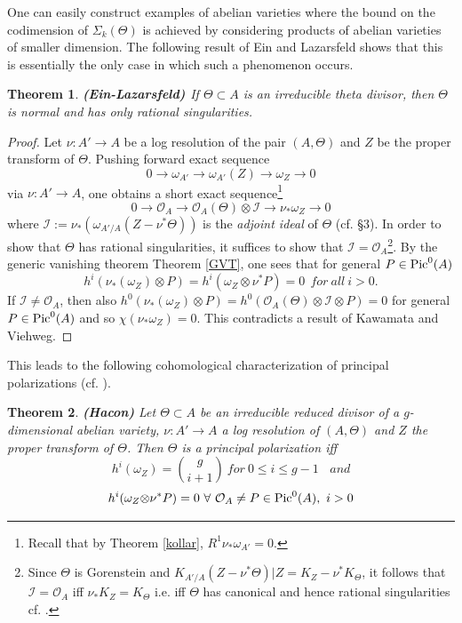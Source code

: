 \documentclass[10pt]{amsart}
\newtheorem{thm}{Theorem}[section]
\newcommand\Pic{{\text{\rm Pic}}}
\newcommand\lra{\longrightarrow}
\newcommand\ot{{\otimes}}
\newcommand\OO{{\mathcal{O}}}
\newcommand\II{{\mathcal{I}}}
\begin{document}
One can easily construct examples of abelian varieties where the bound
on the codimension of $\Sigma _k(\Theta )$ 
is achieved by considering products of abelian varieties of smaller dimension. 
The following result of Ein and Lazarsfeld shows that this is essentially 
the only case in which such a phenomenon occurs.
\begin{thm}\label{el}
 {\bf(Ein-Lazarsfeld) \cite{EL}} If $\Theta \subset A$ is an irreducible 
theta divisor, then $\Theta$ is normal and has only rational singularities.
\end{thm}
\begin{proof} Let $\nu :A'\lra A$ be a log resolution of the pair 
$(A,\Theta )$ and $Z$ be the proper transform of $\Theta$.
Pushing forward exact sequence
$$0\lra \omega  _{A'}\lra \omega _{A'}(Z)\lra \omega _Z\lra 0$$
via $\nu :A'\lra A$, one obtains a short exact sequence\footnote{Recall that
by Theorem \ref{kollar}, $R^1\nu _* \omega _{A'}=0$.}
$$0\lra \OO _A \lra \OO _A (\Theta ) \ot \II \lra \nu_* \omega _Z\lra 0$$ 
where $\II := \nu _* (\omega _{A'/A}(Z-\nu ^* \Theta ))$ is the {\it
adjoint ideal} of $\Theta$ (cf. \cite{Ein} \S 3).
In order to show that $\Theta$ has rational singularities,
it suffices to show that $\II =\OO _A$\footnote{Since $\Theta$ is Gorenstein
and $K_{A'/A}
(Z-\nu ^* \Theta)|Z=K_Z-\nu^*K_{\Theta }$, it follows that $\II =\OO _A$
iff $\nu _* K_Z=K_{\Theta }$ i.e. iff $\Theta $ has canonical and hence
rational singularities cf. \cite{Ein}.}.
By the generic vanishing theorem Theorem \ref{GVT}, one sees that
for general $P\in \Pic ^0(A)$
$$h^i(\nu _* (\omega _Z )\ot P)=h^i(\omega _Z \ot \nu ^*P)=0\ \ for\ all\ 
i>0.$$
If $\II\ne \OO _A$, then also $h^0(\nu _*(\omega _Z) \ot P)=
h^0(\OO _A (\Theta ) \ot \II \ot P)=0$ for general $P\in \Pic ^0(A)$
and so $\chi (\nu _* \omega _Z)=0$.
This contradicts a result of Kawamata and Viehweg.  
\end{proof}
This leads to the following cohomological characterization of principal
polarizations (cf. \cite{Hac1}).
\begin{thm}\label{theta} {\bf (Hacon)} 
Let $\Theta \subset A$ be an irreducible reduced divisor of a
$g$-dimensional abelian variety,
$\nu :A'\lra A$ a log resolution of $(A,\Theta )$ and $Z$ the proper transform
of $\Theta$. Then $\Theta$ is a principal polarization
iff  $$h^i(\omega _Z)=\binom {g}{i+1}\ for \ 
0\leq i\leq g-1\ \ \ \ and$$
$$h^i(\omega _Z \ot \nu ^* P)
=0\ \forall \ \OO _A \ne P\in \Pic ^0(A),\ i>0$$
\end{thm}
\end{document}
